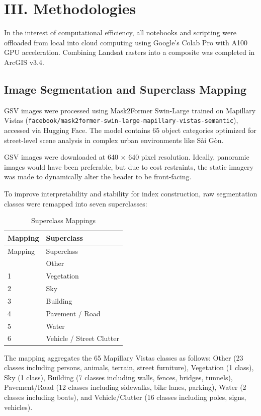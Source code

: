 \documentclass[
]{report}
\begin{document}
\chapter{III. Methodologies}\label{iii.-methodologies}

In the interest of computational efficiency, all notebooks and scripting
were offloaded from local into cloud computing using Google's Colab Pro
with A100 GPU acceleration. Combining Landsat rasters into a composite
was completed in ArcGIS v3.4.

\section{Image Segmentation and Superclass
Mapping}\label{image-segmentation-and-superclass-mapping}

GSV images were processed using Mask2Former Swin-Large trained on
Mapillary Vistas
(\texttt{facebook/mask2former-swin-large-mapillary-vistas-semantic}),
accessed via Hugging Face. The model contains 65 object categories
optimized for street-level scene analysis in complex urban environments
like Sài Gòn.

GSV images were downloaded at 640 × 640 pixel resolution. Ideally,
panoramic images would have been preferable, but due to cost restraints,
the static imagery was made to dynamically alter the header to be
front-facing.

To improve interpretability and stability for index construction, raw
segmentation classes were remapped into seven superclasses:

\begin{longtable}[]{@{}ll@{}}
\caption{Superclass Mappings}\tabularnewline
\toprule\noalign{}
Mapping & Superclass \\
\midrule\noalign{}
\endfirsthead
\toprule\noalign{}
Mapping & Superclass \\
\midrule\noalign{}
\endhead
\bottomrule\noalign{}
\endlastfoot
0 & Other \\
1 & Vegetation \\
2 & Sky \\
3 & Building \\
4 & Pavement / Road \\
5 & Water \\
6 & Vehicle / Street Clutter \\
\end{longtable}

The mapping aggregates the 65 Mapillary Vistas classes as follows: Other
(23 classes including persons, animals, terrain, street furniture),
Vegetation (1 class), Sky (1 class), Building (7 classes including
walls, fences, bridges, tunnels), Pavement/Road (12 classes including
sidewalks, bike lanes, parking), Water (2 classes including boats), and
Vehicle/Clutter (16 classes including poles, signs, vehicles).
\end{document}
